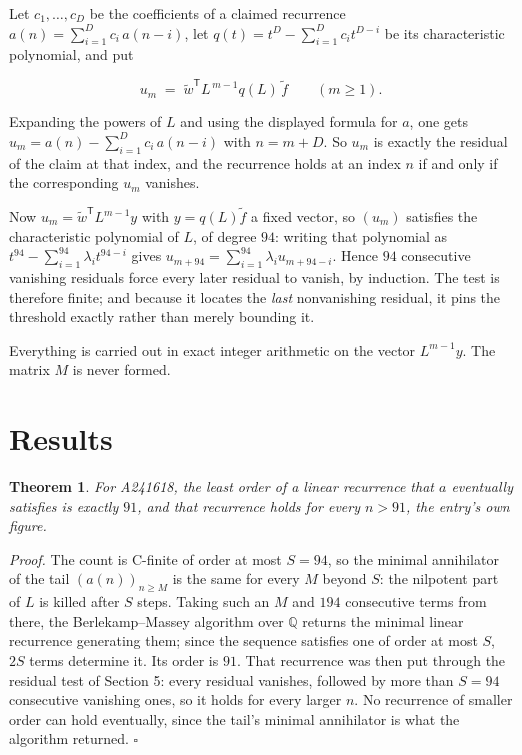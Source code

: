 \documentclass[11pt]{article}
\newtheorem{theorem}{Theorem}
\theoremstyle{definition}
\begin{document}
Let $c_1,\dots,c_D$ be the coefficients of a claimed recurrence $a(n) = \sum_{i=1}^{D} c_i\,a(n-i)$, let $q(t) = t^{D} - \sum_{i=1}^{D} c_i t^{D-i}$ be its characteristic polynomial, and put

\[u_m \;=\; \tilde w^{\mathsf T} L^{\,m-1} q(L)\,\tilde f \qquad (m \ge 1).\]

Expanding the powers of $L$ and using the displayed formula for $a$, one gets $u_m = a(n) - \sum_{i=1}^{D} c_i\,a(n-i)$ with $n = m + D$. So $u_m$ is exactly the residual of the claim at that index, and the recurrence holds at an index $n$ if and only if the corresponding $u_m$ vanishes.

Now $u_m = \tilde w^{\mathsf T} L^{m-1} y$ with $y = q(L)\tilde f$ a fixed vector, so $(u_m)$ satisfies the characteristic polynomial of $L$, of degree $94$: writing that polynomial as $t^{94} - \sum_{i=1}^{94} \lambda_i t^{94-i}$ gives $u_{m+94} = \sum_{i=1}^{94} \lambda_i u_{m+94-i}$. Hence $94$ consecutive vanishing residuals force every later residual to vanish, by induction. The test is therefore finite; and because it locates the {\itshape last} nonvanishing residual, it pins the threshold exactly rather than merely bounding it.

Everything is carried out in exact integer arithmetic on the vector $L^{m-1}y$. The matrix $M$ is never formed.

\section{Results}

\begin{theorem} For A241618, the least order of a linear recurrence that $a$ eventually satisfies is exactly $91$, and that recurrence holds for every $n > 91$, the entry's own figure.\end{theorem}

{\itshape Proof.} The count is C-finite of order at most $S = 94$, so the minimal annihilator of the tail $(a(n))_{n \ge M}$ is the same for every $M$ beyond $S$: the nilpotent part of $L$ is killed after $S$ steps. Taking such an $M$ and $194$ consecutive terms from there, the Berlekamp--Massey algorithm over $\mathbb{Q}$ returns the minimal linear recurrence generating them; since the sequence satisfies one of order at most $S$, $2S$ terms determine it. Its order is $91$. That recurrence was then put through the residual test of Section 5: every residual vanishes, followed by more than $S = 94$ consecutive vanishing ones, so it holds for every larger $n$. No recurrence of smaller order can hold eventually, since the tail's minimal annihilator is what the algorithm returned. $\square$
\end{document}

